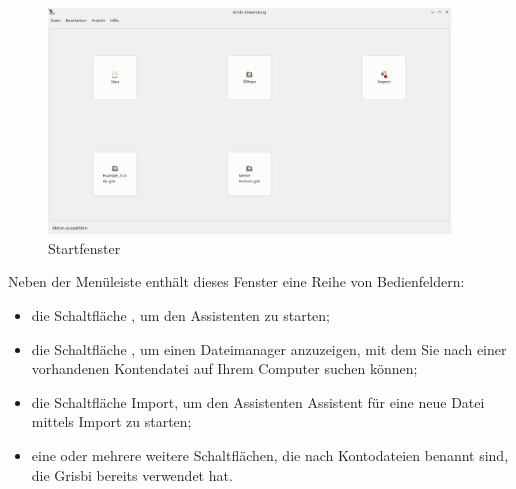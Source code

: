 \begin{figure}[htbp]			%
	\begin{center}					%
		\includegraphics[width=0.95\textwidth]{image/screenshot/home_start_grisbi}		%
	\end{center}
	\caption{Startfenster}%
	\label{home_start_grisbi}					%
\end{figure}


Neben der Menüleiste enthält dieses Fenster eine Reihe von Bedienfeldern:%

\begin{itemize}
	\item die Schaltfläche , um den Assistenten  zu starten;%
	\item die Schaltfläche , um einen Dateimanager anzuzeigen, mit dem Sie nach einer vorhandenen Kontendatei auf Ihrem Computer suchen können;%
	\item die Schaltfläche {Import}, um den Assistenten {Assistent für eine neue Datei mittels Import} zu starten;%
	\item eine oder mehrere weitere Schaltflächen, die nach Kontodateien benannt sind, die Grisbi bereits verwendet hat.%
\end{itemize}

